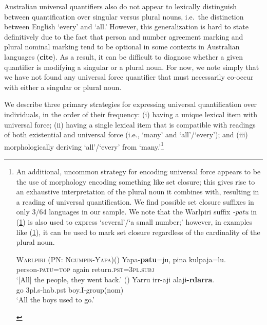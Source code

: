 \documentclass[12pt,egregdoesnotlikesansseriftitles]{scrartcl}
\begin{document}
Australian universal quantifiers also do not appear to lexically distinguish between quantification over singular versus plural nouns, i.e.\ the distinction between English `every' and `all.' However, this generalization is hard to state definitively due to the fact that person and number agreement marking and plural nominal marking tend to be optional in some contexts in Australian languages ({\bf cite}). As a result, it can be difficult to diagnose whether a given quantifier is modifying a singular or a  plural noun. For now, we note simply that we have not found any universal force quantifier that must necessarily co-occur with either a singular or plural noun. %


We describe three primary strategies for expressing universal quantification over individuals, in the order of their frequency: (i) having a unique lexical item with universal force; (ii) having a single lexical item that is compatible with readings of both existential and universal force (i.e., `many' and `all'/`every'); and (iii)  morphologically deriving `all'/`every' from `many.'\footnote{An additional, uncommon strategy for encoding universal force appears to be the use of morphology encoding something like set closure; this gives rise to an exhaustive interpretation of the plural noun it combines with, resulting in a reading of universal quantification. We find possible set closure suffixes in only 3/64 languages in our sample. We note that the Warlpiri suffix {\it -patu} in (\ref{patuex1}) is also used to express `several'/`a small number;' however, in examples like (\ref{patuex1}), it can be used to mark set closure regardless of the cardinality of the plural noun.

\begin{exe}
  \ex \textsc{Warlpiri (PN: Ngumpin-Yapa)}\hfill (\citealt[13--14]{bowler17})
  \gll Yapa-\textbf{patu}=ju, pina kulpaja=lu.\\
  person-\textsc{patu}=\textsc{top} again return.\textsc{pst}=\textsc{3pl.subj}\\
  \glt `[All] the people, they went back.'  \label{patuex1}
  \hfill (\citealt[80]{nordlinger98})
  \gll Yarru irr-aji  alaji\textbf{-rdarra}.\\
  go  3{\sc pl.s-hab.pst} boy.I-{\sc group(nom)}\\
  \glt `All the boys used to go.' 
\end{exe}}
\end{document}

